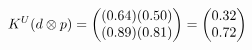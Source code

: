 \documentclass[preview]{standalone}
\begin{document}
\begin{align*}
\special{dvisvgm:raw <g id='unique000'>}K^U(d \otimes p) = \begin{pmatrix} (0.64)(0.50) \\ (0.89)(0.81) \end{pmatrix} = \begin{pmatrix} 0.32 \\ 0.72 \end{pmatrix}\special{dvisvgm:raw </g>}
\end{align*}
\end{document}
